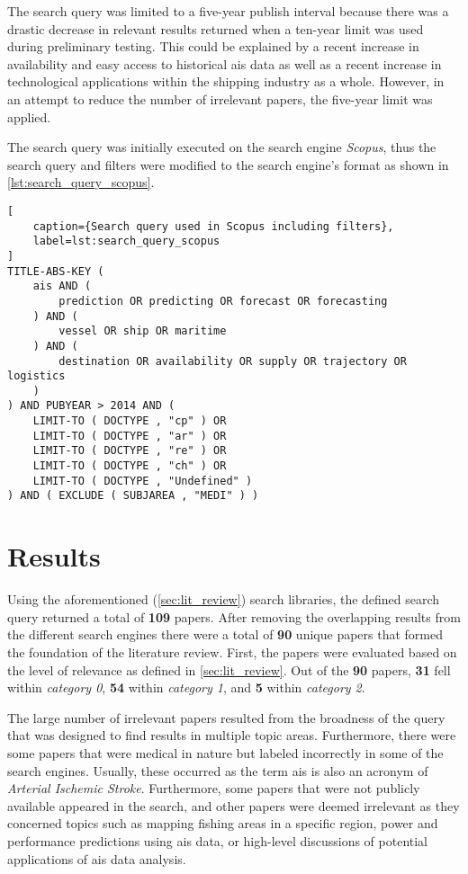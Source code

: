 The search query was limited to a five-year publish interval because there was a drastic decrease in relevant results returned when a ten-year limit was used during preliminary testing. This could be explained by a recent increase in availability and easy access to historical \acrshort{ais} data as well as a recent increase in technological applications within the shipping industry as a whole. However, in an attempt to reduce the number of irrelevant papers, the five-year limit was applied.

The search query was initially executed on the search engine \textit{Scopus}, thus the search query and filters were modified to the search engine's format as shown in \cref{lst:search_query_scopus}.

\begin{lstlisting}[
    caption={Search query used in Scopus including filters},
    label=lst:search_query_scopus
]
TITLE-ABS-KEY (
    ais AND (
        prediction OR predicting OR forecast OR forecasting
    ) AND (
        vessel OR ship OR maritime
    ) AND (
        destination OR availability OR supply OR trajectory OR logistics
    )
) AND PUBYEAR > 2014 AND (
    LIMIT-TO ( DOCTYPE , "cp" ) OR
    LIMIT-TO ( DOCTYPE , "ar" ) OR
    LIMIT-TO ( DOCTYPE , "re" ) OR
    LIMIT-TO ( DOCTYPE , "ch" ) OR
    LIMIT-TO ( DOCTYPE , "Undefined" )
) AND ( EXCLUDE ( SUBJAREA , "MEDI" ) )
\end{lstlisting}

\section{Results}
\label{sec:lit_results}

Using the aforementioned (\cref{sec:lit_review}) search libraries, the defined search query returned a total of \textbf{109} papers. After removing the overlapping results from the different search engines there were a total of \textbf{90} unique papers that formed the foundation of the literature review. First, the papers were evaluated based on the level of relevance as defined in \cref{sec:lit_review}. Out of the \textbf{90} papers, \textbf{31} fell within \textit{category 0}, \textbf{54} within \textit{category 1}, and \textbf{5} within \textit{category 2}.

The large number of irrelevant papers resulted from the broadness of the query that was designed to find results in multiple topic areas. Furthermore, there were some papers that were medical in nature but labeled incorrectly in some of the search engines. Usually, these occurred as the term \acrshort{ais} is also an acronym of \textit{Arterial Ischemic Stroke}. Furthermore, some papers that were not publicly available appeared in the search, and other papers were deemed irrelevant as they concerned topics such as mapping fishing areas in a specific region, power and performance predictions using \acrshort{ais} data, or high-level discussions of potential applications of \acrshort{ais} data analysis.

